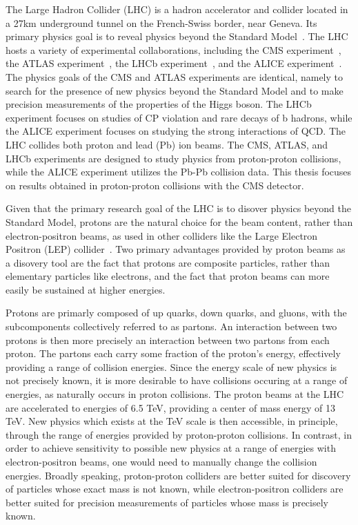 The Large Hadron Collider (LHC) is a hadron accelerator and collider located in a 27km underground tunnel on the French-Swiss border, near Geneva.
Its primary physics goal is to reveal physics beyond the Standard Model~\cite{Evans_2008}.
The LHC hosts a variety of experimental collaborations, including the CMS experiment~\cite{Chatrchyan:2008aa}, the ATLAS experiment~\cite{Aad:2008zzm}, the LHCb experiment~\cite{Alves:2008zz}, and the ALICE experiment~\cite{Aamodt:2008zz}.
The physics goals of the CMS and ATLAS experiments are identical, namely to search for the presence of new physics beyond the Standard Model and to make precision measurements of the properties of the Higgs boson.
The LHCb experiment focuses on studies of CP violation and rare decays of b hadrons, while the ALICE experiment focuses on studying the strong interactions of QCD.
The LHC collides both proton and lead (Pb) ion beams.
The CMS, ATLAS, and LHCb experiments are designed to study physics from proton-proton collisions, while the ALICE experiment utilizes the Pb-Pb collision data.
This thesis focuses on results obtained in proton-proton collisions with the CMS detector.

Given that the primary research goal of the LHC is to disover physics beyond the Standard Model, protons are the natural choice for the beam content, rather than electron-positron beams, as used in other colliders like the Large Electron Positron (LEP) collider~\cite{Taylor:2017edx}.
Two primary advantages provided by proton beams as a disovery tool are the fact that protons are composite particles, rather than elementary particles like electrons, and the fact that proton beams can more easily be sustained at higher energies.

Protons are primarly composed of up quarks, down quarks, and gluons, with the subcomponents collectively referred to as partons.
An interaction between two protons is then more precisely an interaction between two partons from each proton.
The partons each carry some fraction of the proton's energy, effectively providing a range of collision energies.
Since the energy scale of new physics is not precisely known, it is more desirable to have collisions occuring at a range of energies, as naturally occurs in proton collisions.
The proton beams at the LHC are accelerated to energies of 6.5 TeV, providing a center of mass energy of 13 TeV.
New physics which exists at the TeV scale is then accessible, in principle, through the range of energies provided by proton-proton collisions.
In contrast, in order to achieve sensitivity to possible new physics at a range of energies with electron-positron beams, one would need to manually change the collision energies.
Broadly speaking, proton-proton colliders are better suited for discovery of particles whose exact mass is not known, while electron-positron colliders are better suited for precision measurements of particles whose mass is precisely known.

